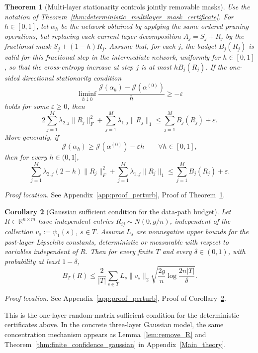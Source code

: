 \documentclass[11pt]{article}
\theoremstyle{plain}
\newtheorem{thm}{Theorem}[section]
\newtheorem{cor}[thm]{Corollary}
\theoremstyle{definition}
\theoremstyle{remark}
\newcommand{\R}{\mathbb{R}}
\newcommand{\1}{\mathbf{1}}
\newcommand{\proofloc}[1]{\par\noindent\emph{Proof location.} #1\par}
\begin{document}
\begin{thm}[Multi-layer stationarity controls jointly removable masks]
\label{thm:deterministic_multilayer_mask_stationarity}
Use the notation of Theorem~\ref{thm:deterministic_multilayer_mask_certificate}. For \(h\in[0,1]\), let \(\alpha_h\) be the network obtained by applying the same ordered pruning operations, but replacing each current layer decomposition \(A_j=S_j+R_j\) by the fractional mask \(S_j+(1-h)R_j\). Assume that, for each \(j\), the budget \(B_j(R_j)\) is valid for this fractional step in the intermediate network, uniformly for \(h\in[0,1]\), so that the cross-entropy increase at step \(j\) is at most \(hB_j(R_j)\). If the one-sided directional stationarity condition
\[
\liminf_{h\downarrow0}
\frac{\mathcal J(\alpha_h)-\mathcal J(\alpha^{(0)})}{h}
\ge
-\varepsilon
\]
holds for some \(\varepsilon\ge0\), then
\[
2\sum_{j=1}^M\lambda_{2,j}\|R_j\|_F^2
+
\sum_{j=1}^M\lambda_{1,j}\|R_j\|_1
\le
\sum_{j=1}^M B_j(R_j)+\varepsilon.
\]
More generally, if
\[
\mathcal J(\alpha_h)\ge\mathcal J(\alpha^{(0)})-\varepsilon h
\qquad\forall h\in[0,1],
\]
then for every \(h\in(0,1]\),
\[
\sum_{j=1}^M\lambda_{2,j}(2-h)\|R_j\|_F^2
+
\sum_{j=1}^M\lambda_{1,j}\|R_j\|_1
\le
\sum_{j=1}^M B_j(R_j)+\varepsilon.
\]
\end{thm}
\proofloc{See Appendix~\ref{app:proof_perturb}, Proof of Theorem~\ref{thm:deterministic_multilayer_mask_stationarity}.}

\begin{cor}[Gaussian sufficient condition for the data-path budget]
\label{cor:gaussian_data_path_budget}
Let \(R\in\R^{n\times m}\) have independent entries \(R_{ij}\sim N(0,g/n)\), independent of the collection \(v_s:=\psi_1(s)\), \(s\in T\). Assume \(L_s\) are nonnegative upper bounds for the post-layer Lipschitz constants, deterministic or measurable with respect to variables independent of \(R\). Then for every finite \(T\) and every \(\delta\in(0,1)\), with probability at least \(1-\delta\),
\[
B_T(R)
\le
\frac2{|T|}
\sum_{s\in T}
L_s\|v_s\|_2
\sqrt{
\frac{2g}{n}\log\frac{2n|T|}{\delta}
}.
\]
\end{cor}
\proofloc{See Appendix~\ref{app:proof_perturb}, Proof of Corollary~\ref{cor:gaussian_data_path_budget}.}

This is the one-layer random-matrix sufficient condition for the deterministic certificates above. In the concrete three-layer Gaussian model, the same concentration mechanism appears as Lemma~\ref{lem:remove_R} and Theorem~\ref{thm:finite_confidence_gaussian} in Appendix~\ref{Main_theory}.
\end{document}

